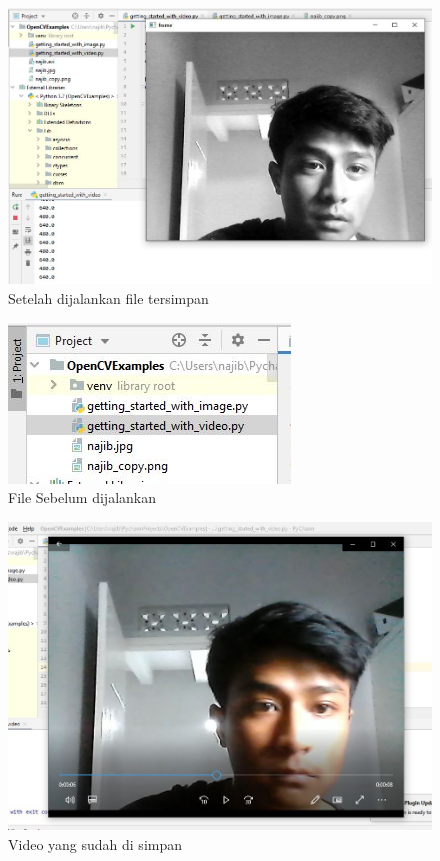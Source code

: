 \begin{figure}[ht]
\centering
\includegraphics[scale=0.5]{figures/2,7.jpg}
\caption{Setelah dijalankan file tersimpan}
\label{contoh}
\end{figure}

\newpage
\begin{figure}[ht]
\centering
\includegraphics[scale=0.8]{figures/2,7,1.jpg}
\caption{File Sebelum dijalankan}
\label{contoh}
\end{figure}

\begin{figure}[ht]
\centering
\includegraphics[scale=0.5]{figures/2,7,2.jpg}
\caption{Video yang sudah di simpan}
\label{contoh}
\end{figure}


